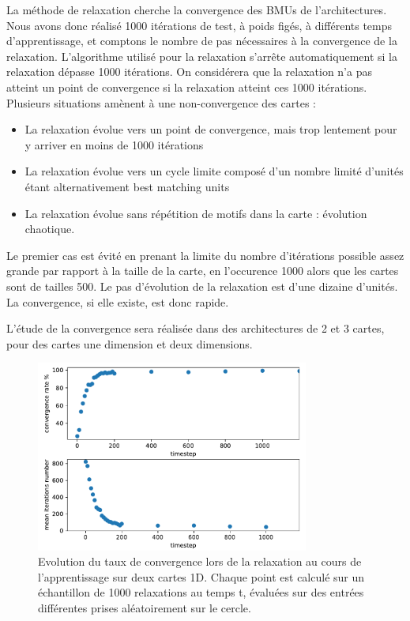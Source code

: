 La méthode de relaxation cherche la convergence des BMUs de l'architectures. Nous avons donc réalisé 1000 itérations de test, à poids figés, à différents temps d'apprentissage, et comptons le nombre de pas nécessaires à la convergence de la relaxation. L'algorithme utilisé pour la relaxation s'arrête automatiquement si la relaxation dépasse 1000 itérations. On considérera que la relaxation n'a pas atteint un point de convergence si la relaxation atteint ces 1000 itérations.
Plusieurs situations amènent à une non-convergence des cartes  : 
\begin{itemize}
\item La relaxation évolue vers un point de convergence, mais trop lentement pour y arriver en moins de 1000 itérations
\item La relaxation évolue vers un cycle limite composé d'un nombre limité d'unités étant alternativement best matching units
\item La relaxation évolue sans répétition de motifs dans la carte : évolution chaotique.
\end{itemize}
Le premier cas est évité en prenant la limite du nombre d'itérations possible assez grande par rapport à la taille de la carte, en l'occurence 1000 alors que les cartes sont de tailles 500. Le pas d'évolution de la relaxation est d'une dizaine d'unités. La convergence, si elle existe, est donc rapide.

L'étude de la convergence sera réalisée dans des architectures de 2 et 3 cartes, pour des cartes une dimension et deux dimensions.

\begin{figure}
\centering
\includegraphics[width=0.8\textwidth]{1D_conv_evolution.pdf}
\caption{Evolution du taux de convergence lors de la relaxation au cours de l'apprentissage sur deux cartes 1D. Chaque point est calculé sur un échantillon de 1000 relaxations au temps t, évaluées sur des entrées différentes prises aléatoirement sur le cercle.}
\label{fig:conv_evolution}
\end{figure}


